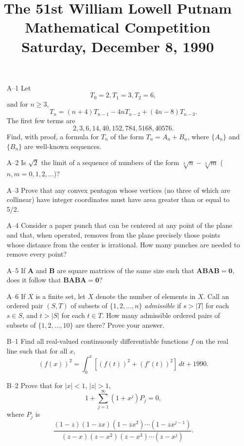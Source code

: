 \documentclass[amssymb,twocolumn,pra,10pt,aps]{revtex4-1}
\begin{document}
\title{The 51st William Lowell Putnam Mathematical Competition \\
    Saturday, December 8, 1990}
\maketitle

\begin{itemize}
\item[A--1] Let
\[
T_0 = 2, T_1 = 3, T_2 = 6,
\]
and for $n \geq 3$,
\[
T_n = (n+4)T_{n-1} - 4n T_{n-2} + (4n-8) T_{n-3}.
\]
The first few terms are
\[
2, 3, 6, 14, 40, 152, 784, 5168, 40576.
\]
Find, with proof, a formula for $T_n$ of the form $T_n = A_n + B_n$,
where $\{A_n\}$ and $\{B_n\}$ are well-known sequences.

\item[A--2] Is $\sqrt{2}$ the limit of a sequence of numbers of the form
$\sqrt[3]{n} - \sqrt[3]{m}$ ($n,m = 0, 1, 2, \dots$)?

\item[A--3] Prove that any convex pentagon whose vertices (no three of
which are collinear) have integer coordinates must have area greater than
or equal to 5/2.

\item[A--4] Consider a paper punch that can be centered at any point of
the plane and that, when operated, removes from the plane precisely those
points whose distance from the center is irrational. How many punches are
needed to remove every point?

\item[A--5] If $\mathbf{A}$ and $\mathbf{B}$ are square matrices of the
same size such that $\mathbf{ABAB = 0}$, does it follow that
$\mathbf{BABA = 0}$?

\item[A--6] If $X$ is a finite set, let $X$ denote the number of elements
in $X$. Call an ordered pair $(S, T)$ of subsets of $\{1, 2, \dots, n\}$
{\em admissible} if $s > |T|$ for each $s \in S$, and $t > |S|$ for each
$t \in T$. How many admissible ordered pairs of subsets of $\{1, 2,
\dots, 10\}$ are there? Prove your answer.

\item[B--1] Find all real-valued continuously differentiable functions $f$
on the real line such that for all $x$,
\[
(f(x))^2 = \int_0^x [(f(t))^2 + (f'(t))^2]\,dt + 1990.
\]

\item[B--2] Prove that for $|x| < 1$, $|z| > 1$,
\[
1 + \sum_{j=1}^\infty (1 + x^j)P_j = 0,
\]
where $P_j$ is
\[
\frac{(1 - z)(1 - zx)(1 - zx^2) \cdots (1 - zx^{j-1})}
{(z - x)(z - x^2)(z - x^3) \cdots (z - x^j)}.
\]


\end{itemize}
\end{document}
